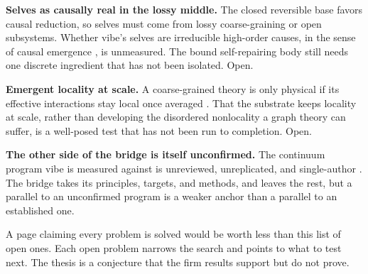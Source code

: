 \textbf{Selves as causally real in the lossy middle.} The closed reversible base favors causal reduction, so selves must
come from lossy coarse-graining or open subsystems. Whether vibe's selves are irreducible high-order causes, in the sense
of causal emergence \cite{hoel2013}, is unmeasured. The bound self-repairing body still needs one discrete ingredient that
has not been isolated. Open.

\textbf{Emergent locality at scale.} A coarse-grained theory is only physical if its effective interactions stay local once
averaged \cite{konopka2008}. That the substrate keeps locality at scale, rather than developing the disordered nonlocality
a graph theory can suffer, is a well-posed test that has not been run to completion. Open.

\textbf{The other side of the bridge is itself unconfirmed.} The continuum program vibe is measured against is unreviewed,
unreplicated, and single-author \cite{herbert2025chronoflux}. The bridge takes its principles, targets, and methods, and
leaves the rest, but a parallel to an unconfirmed program is a weaker anchor than a parallel to an established one.

A page claiming every problem is solved would be worth less than this list of open ones. Each open problem narrows the search
and points to what to test next. The thesis is a conjecture that the firm results support but do not prove.
